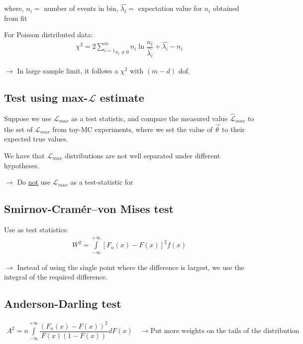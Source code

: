 where, $n_i=$ number of events in bin, $\hat{\lambda_i}=$ expectation value for $n_i$ obtained from fit

For Poisson distributed data: 
\begin{align}
  \chi^2 = 2 \underset{n_i \neq 0}{\sum \limits_{i=1}^m} n_i \ln \dfrac{n_i}{\hat{\lambda_i}} + \hat{\lambda_i} - n_i 
\end{align}

$\to$ In large sample limit, it follows a $\chi^2$ with $(m-d)$ dof. 

\subsection{Test using max-$\mathcal{L}$ estimate}
Suppose we use $\mathcal{L}_{max}$ as a test statistic, and compare the measured value $\hat{\mathcal{L}}_{max}$ to the set of $\mathcal{L}_{max}$ from toy-MC experiments, where we set the value of $\vec{\theta}$ to their expected true values. 

We have that $\mathcal{L}_{max}$ distributions are not well separated under different hypotheses. 

$\to$ Do \underline{not} use $\mathcal{L}_{max}$ as a test-statistic for  

\subsection{Smirnov-Cramér–von Mises test}
Use as test statistics:
\begin{align}
  W^2 = \int \limits_{-\infty}^{+\infty} [F_n(x)-F(x)]^2 f(x) 
\end{align}

$\to$ Instead of using the single point where the difference is largest, we use the integral of the required difference. 

\subsection{Anderson-Darling test}
\begin{align}
  A^2 = n \int \limits_{-\infty}^{+\infty} \dfrac{(F_n(x) - F(x))^2}{F(x)(1 - F(x))} dF(x) \quad \to\text{Put more weights on the tails of the distribution}
\end{align}
